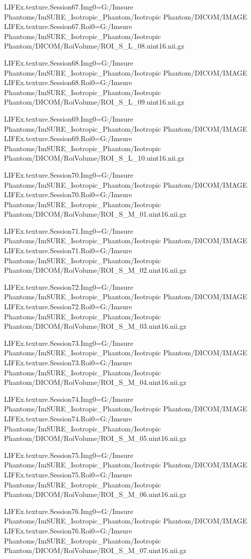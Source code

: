 LIFEx.texture.Session67.Img0=G:/Imsure Phantoms/ImSURE_Isotropic_Phantom/Isotropic Phantom/DICOM/IMAGE
LIFEx.texture.Session67.Roi0=G:/Imsure Phantoms/ImSURE_Isotropic_Phantom/Isotropic Phantom/DICOM/RoiVolume/ROI_S_L_08.uint16.nii.gz

LIFEx.texture.Session68.Img0=G:/Imsure Phantoms/ImSURE_Isotropic_Phantom/Isotropic Phantom/DICOM/IMAGE
LIFEx.texture.Session68.Roi0=G:/Imsure Phantoms/ImSURE_Isotropic_Phantom/Isotropic Phantom/DICOM/RoiVolume/ROI_S_L_09.uint16.nii.gz

LIFEx.texture.Session69.Img0=G:/Imsure Phantoms/ImSURE_Isotropic_Phantom/Isotropic Phantom/DICOM/IMAGE
LIFEx.texture.Session69.Roi0=G:/Imsure Phantoms/ImSURE_Isotropic_Phantom/Isotropic Phantom/DICOM/RoiVolume/ROI_S_L_10.uint16.nii.gz

LIFEx.texture.Session70.Img0=G:/Imsure Phantoms/ImSURE_Isotropic_Phantom/Isotropic Phantom/DICOM/IMAGE
LIFEx.texture.Session70.Roi0=G:/Imsure Phantoms/ImSURE_Isotropic_Phantom/Isotropic Phantom/DICOM/RoiVolume/ROI_S_M_01.uint16.nii.gz

LIFEx.texture.Session71.Img0=G:/Imsure Phantoms/ImSURE_Isotropic_Phantom/Isotropic Phantom/DICOM/IMAGE
LIFEx.texture.Session71.Roi0=G:/Imsure Phantoms/ImSURE_Isotropic_Phantom/Isotropic Phantom/DICOM/RoiVolume/ROI_S_M_02.uint16.nii.gz

LIFEx.texture.Session72.Img0=G:/Imsure Phantoms/ImSURE_Isotropic_Phantom/Isotropic Phantom/DICOM/IMAGE
LIFEx.texture.Session72.Roi0=G:/Imsure Phantoms/ImSURE_Isotropic_Phantom/Isotropic Phantom/DICOM/RoiVolume/ROI_S_M_03.uint16.nii.gz

LIFEx.texture.Session73.Img0=G:/Imsure Phantoms/ImSURE_Isotropic_Phantom/Isotropic Phantom/DICOM/IMAGE
LIFEx.texture.Session73.Roi0=G:/Imsure Phantoms/ImSURE_Isotropic_Phantom/Isotropic Phantom/DICOM/RoiVolume/ROI_S_M_04.uint16.nii.gz

LIFEx.texture.Session74.Img0=G:/Imsure Phantoms/ImSURE_Isotropic_Phantom/Isotropic Phantom/DICOM/IMAGE
LIFEx.texture.Session74.Roi0=G:/Imsure Phantoms/ImSURE_Isotropic_Phantom/Isotropic Phantom/DICOM/RoiVolume/ROI_S_M_05.uint16.nii.gz

LIFEx.texture.Session75.Img0=G:/Imsure Phantoms/ImSURE_Isotropic_Phantom/Isotropic Phantom/DICOM/IMAGE
LIFEx.texture.Session75.Roi0=G:/Imsure Phantoms/ImSURE_Isotropic_Phantom/Isotropic Phantom/DICOM/RoiVolume/ROI_S_M_06.uint16.nii.gz

LIFEx.texture.Session76.Img0=G:/Imsure Phantoms/ImSURE_Isotropic_Phantom/Isotropic Phantom/DICOM/IMAGE
LIFEx.texture.Session76.Roi0=G:/Imsure Phantoms/ImSURE_Isotropic_Phantom/Isotropic Phantom/DICOM/RoiVolume/ROI_S_M_07.uint16.nii.gz

